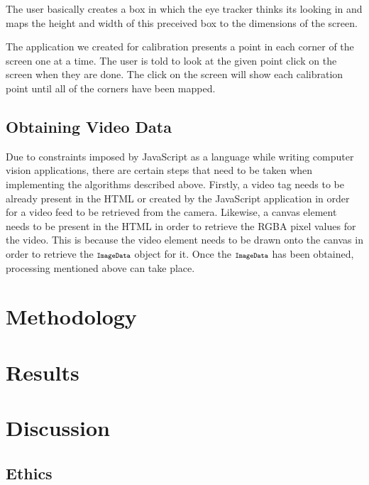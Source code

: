 \documentclass[annual]{acmsiggraph}
\newcommand{\Acronym}[1]{\ensuremath{{\small{\texttt{#1}}}}}
\begin{document}
The user basically creates a box in which the eye tracker thinks its looking in
and maps the height and width of this preceived box to the dimensions of the
screen.

The application we created for calibration presents a point in each corner of
the screen one at a time. The user is told to look at the given point click on
the screen when they are done. The click on the screen will show each
calibration point until all of the corners have been mapped.

\subsection{Obtaining Video Data}

%
%
%

Due to constraints imposed by JavaScript as a language while writing computer
vision applications, there are certain steps that need to be taken when
implementing the algorithms described above. Firstly, a video tag needs to be
already present in the HTML or created by the JavaScript application in order
for a video feed to be retrieved from the camera. Likewise, a canvas element
needs to be present in the HTML in order to retrieve the RGBA pixel values for
the video.  This is because the video element needs to be drawn onto the canvas
in order to retrieve the $\Acronym{ImageData}$ object for it. Once the
$\Acronym{ImageData}$ has been obtained, processing mentioned above can take
place.

\section{Methodology}

\section{Results}

\section{Discussion}

\subsection{Ethics}
\end{document}
